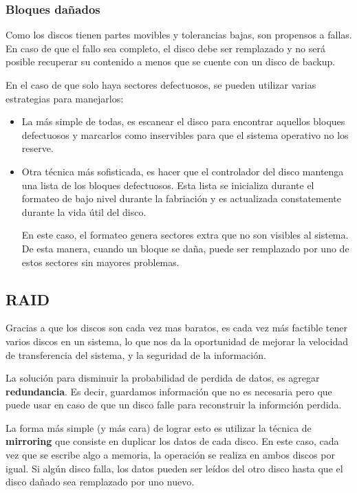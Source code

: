 \subsubsection{Bloques dañados}
Como los discos tienen partes movibles y tolerancias bajas, son propensos a fallas. En caso de que el fallo sea completo, el disco debe ser remplazado y no será posible recuperar su contenido a menos que se cuente con un disco de backup. 

En el caso de que solo haya sectores defectuosos, se pueden utilizar varias estrategias para manejarlos:
\begin{itemize}
	\item La más simple de todas, es escanear el disco para encontrar aquellos bloques defectuosos y marcarlos como inservibles para que el sistema operativo no los reserve.
	\item Otra técnica más sofisticada, es hacer que el controlador del disco mantenga una lista de los bloques defectuosos. Esta lista se inicializa durante el formateo de bajo nivel durante la fabriación y es actualizada constatemente durante la vida útil del disco.
	
	En este caso, el formateo genera sectores extra que no son visibles al sistema. De esta manera, cuando un bloque se daña, puede ser remplazado por uno de estos sectores sin mayores problemas.
\end{itemize}

\subsection{RAID}
Gracias a que los discos son cada vez mas baratos, es cada vez más factible tener varios discos en un sistema, lo que nos da la oportunidad de mejorar la velocidad de transferencia del sistema, y la seguridad de la información.

La solución para disminuir la probabilidad de perdida de datos, es agregar \textbf{redundancia}. Es decir, guardamos información que no es necesaria pero que puede usar en caso de que un disco falle para reconstruir la informción perdida.

La forma más simple (y más cara) de lograr esto es utilizar la técnica de \textbf{mirroring} que consiste en duplicar los datos de cada disco. En este caso, cada vez que se escribe algo a memoria, la operación se realiza en ambos discos por igual. Si algún disco falla, los datos pueden ser leídos del otro disco hasta que el disco dañado sea remplazado por uno nuevo.

